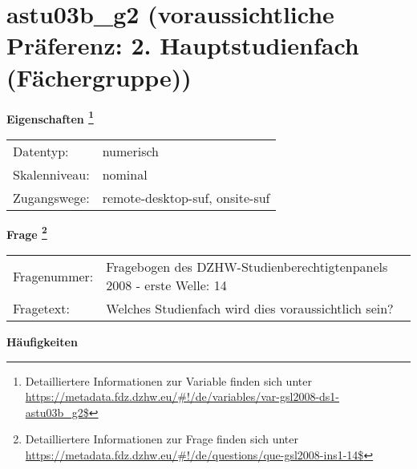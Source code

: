 
    \setcounter{footnote}{0}

    \vspace*{-1.8cm}
	\section{astu03b\_g2 (voraussichtliche Präferenz: 2. Hauptstudienfach (Fächergruppe))}
	\label{section:astu03b_g2}



    \vspace*{0.5cm}
    \noindent\textbf{Eigenschaften
	\footnote{Detailliertere Informationen zur Variable finden sich unter
		\url{https://metadata.fdz.dzhw.eu/\#!/de/variables/var-gsl2008-ds1-astu03b_g2$}}}\\
	\begin{tabularx}{\hsize}{@{}lX}
	Datentyp: & numerisch \\
	Skalenniveau: & nominal \\
	Zugangswege: &
	  remote-desktop-suf, 
	  onsite-suf
 \\
    \end{tabularx}



				\vspace*{0.5cm}
                \noindent\textbf{Frage
	                \footnote{Detailliertere Informationen zur Frage finden sich unter
		              \url{https://metadata.fdz.dzhw.eu/\#!/de/questions/que-gsl2008-ins1-14$}}}\\
				\begin{tabularx}{\hsize}{@{}lX}
					Fragenummer: &
					  Fragebogen des DZHW-Studienberechtigtenpanels 2008 - erste Welle:
					  14
 \\
					Fragetext: & Welches Studienfach wird dies voraussichtlich sein? \\
				\end{tabularx}





        		\vspace*{0.5cm}
                \noindent\textbf{Häufigkeiten}

